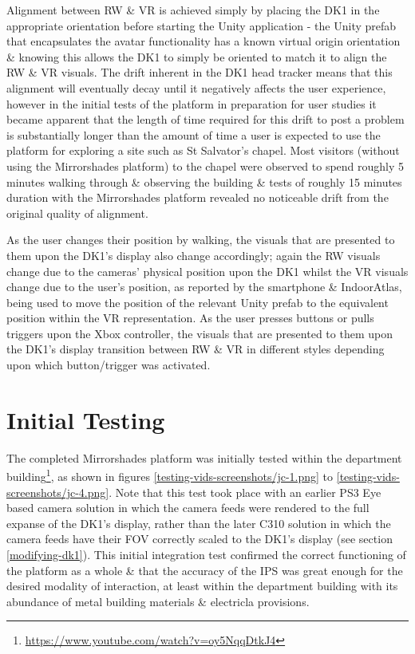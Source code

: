 Alignment between RW \& VR is achieved simply by placing the DK1 in the appropriate orientation before starting the Unity application - the Unity prefab that encapsulates the avatar functionality has a known virtual origin orientation \& knowing this allows the DK1 to simply be oriented to match it to align the RW \& VR visuals. The drift inherent in the DK1 head tracker means that this alignment will eventually decay until it negatively affects the user experience, however in the initial tests of the platform in preparation for user studies it became apparent that the length of time required for this drift to post a problem is substantially longer than the amount of time a user is expected to use the platform for exploring a site such as St Salvator's chapel. Most visitors (without using the Mirrorshades platform) to the chapel were observed to spend roughly 5 minutes walking through \& observing the building \& tests of roughly 15 minutes duration with the Mirrorshades platform revealed no noticeable drift from the original quality of alignment.

As the user changes their position by walking, the visuals that are presented to them upon the DK1's display also change accordingly; again the RW visuals change due to the cameras' physical position upon the DK1 whilst the VR visuals change due to the user's position, as reported by the smartphone \& IndoorAtlas, being used to move the position of the relevant Unity prefab to the equivalent position within the VR representation. As the user presses buttons or pulls triggers upon the Xbox controller, the visuals that are presented to them upon the DK1's display transition between RW \& VR in different styles depending upon which button/trigger was activated.


\section{Initial Testing}

The completed Mirrorshades platform was initially tested within the department building\footnote{\url{https://www.youtube.com/watch?v=oy5NqqDtkJ4}}, as shown in figures \ref{testing-vids-screenshots/jc-1.png} to \ref{testing-vids-screenshots/jc-4.png}. Note that this test took place with an earlier PS3 Eye based camera solution in which the camera feeds were rendered to the full expanse of the DK1's display, rather than the later C310 solution in which the camera feeds have their FOV correctly scaled to the DK1's display (see section \ref{modifying-dk1}). This initial integration test confirmed the correct functioning of the platform as a whole \& that the accuracy of the IPS was great enough for the desired modality of interaction, at least within the department building with its abundance of metal building materials \& electricla provisions.

